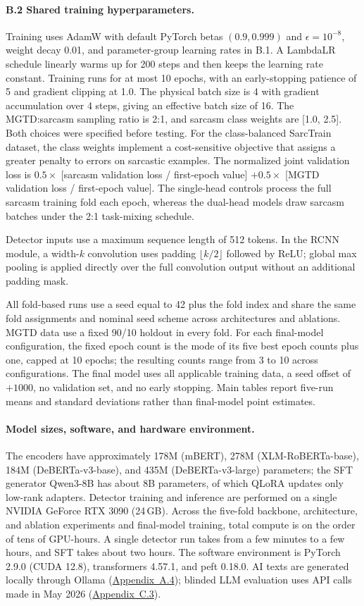 \paragraph{B.2 Shared training hyperparameters.} Training uses AdamW with default PyTorch betas $(0.9,0.999)$ and $\epsilon=10^{-8}$, weight decay 0.01, and parameter-group learning rates in B.1. A LambdaLR schedule linearly warms up for 200 steps and then keeps the learning rate constant. Training runs for at most 10 epochs, with an early-stopping patience of 5 and gradient clipping at 1.0. The physical batch size is 4 with gradient accumulation over 4 steps, giving an effective batch size of 16. The MGTD:sarcasm sampling ratio is 2:1, and sarcasm class weights are [1.0, 2.5]. Both choices were specified before testing. For the class-balanced SarcTrain dataset, the class weights implement a cost-sensitive objective that assigns a greater penalty to errors on sarcastic examples. The normalized joint validation loss is $0.5 \times$ [sarcasm validation loss / first-epoch value] $+ 0.5 \times$ [MGTD validation loss / first-epoch value]. The single-head controls process the full sarcasm training fold each epoch, whereas the dual-head models draw sarcasm batches under the 2:1 task-mixing schedule.

Detector inputs use a maximum sequence length of 512 tokens. In the RCNN module, a width-$k$ convolution uses padding $\lfloor k/2\rfloor$ followed by ReLU; global max pooling is applied directly over the full convolution output without an additional padding mask.

All fold-based runs use a seed equal to 42 plus the fold index and share the same fold assignments and nominal seed scheme across architectures and ablations. MGTD data use a fixed 90/10 holdout in every fold. For each final-model configuration, the fixed epoch count is the mode of its five best epoch counts plus one, capped at 10 epochs; the resulting counts range from 3 to 10 across configurations. The final model uses all applicable training data, a seed offset of $+1000$, no validation set, and no early stopping. Main tables report five-run means and standard deviations rather than final-model point estimates.

\paragraph{Model sizes, software, and hardware environment.} The encoders have approximately 178M (mBERT), 278M (XLM-RoBERTa-base), 184M (DeBERTa-v3-base), and 435M (DeBERTa-v3-large) parameters; the SFT generator Qwen3-8B has about 8B parameters, of which QLoRA updates only low-rank adapters. Detector training and inference are performed on a single NVIDIA GeForce RTX 3090 (24\,GB). Across the five-fold backbone, architecture, and ablation experiments and final-model training, total compute is on the order of tens of GPU-hours. A single detector run takes from a few minutes to a few hours, and SFT takes about two hours. The software environment is PyTorch 2.9.0 (CUDA 12.8), transformers 4.57.1, and peft 0.18.0. AI texts are generated locally through Ollama (\hyperref[app:a4]{Appendix~A.4}); blinded LLM evaluation uses API calls made in May 2026 (\hyperref[app:c3]{Appendix~C.3}).

